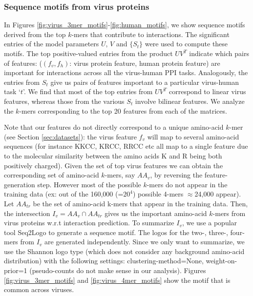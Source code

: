 \documentclass[runningheads,a4paper]{llncs}
\begin{document}
\subsubsection{Sequence motifs from virus proteins}
In Figures \ref{fig:virus_3mer_motifs}-\ref{fig:human_motifs}, we show sequence motifs derived from the top $k$-mers that contribute to interactions. The significant entries of the model parameters $U$, $V$ and $\{S_t\}$ were used to 
compute these motifs. The top positive-valued entries from the product $U V^T$ indicate which pairs of features: ($(f_v, f_h)$: virus protein feature, human protein feature) are important for interactions across all the virus-human PPI tasks.
Analogously, the entries from $S_t$ give us pairs of features important to a particular virus-human task `$t$'.
We find that most of the top entries from $U V^T$ correspond to linear virus features, whereas those from the various $S_t$
involve bilinear features. We analyze the $k$-mers corresponding to the top 20 features from each of the matrices.

Note that our features do not directly correspond to a unique amino-acid $k$-mer (see Section \ref{sec:datasets}): 
the virus feature $f_v$ will map to several amino-acid sequences (for instance KKCC, KRCC, RRCC etc all map to a single feature due to the molecular similarity between the amino acids K and R being both positively charged). Given the set of top virus features we can obtain the corresponding set of 
amino-acid $k$-mers, say $AA_v$, by reversing the feature-generation step. However most of the possible $k$-mers do not appear in the 
training data (ex: out of the 160,000 (=$20^4$) possible 4-mers $\approx$24,000 appear). Let $AA_{tr}$
be the set of amino-acid k-mers that appear in the training data. Then, the intersection $I_v = AA_v \cap AA_{tr}$ gives us the important amino-acid $k$-mers from virus proteins w.r.t interaction prediction. 
To summarize $I_v$, we use a popular tool Seq2Logo \cite{seq2logo} to generate a sequence motif. 
The logos for the two-, three-, four-mers from $I_v$ are generated independently. Since we only
want to summarize, we use the Shannon logo type (which does not consider any background amino-acid distribution)
with the following settings: clustering-method=None, weight-on-prior=1 (pseudo-counts do not make sense in our
analysis). Figures \ref{fig:virus_3mer_motifs} and \ref{fig:virus_4mer_motifs} show the motif that is common across viruses. %
\end{document}
